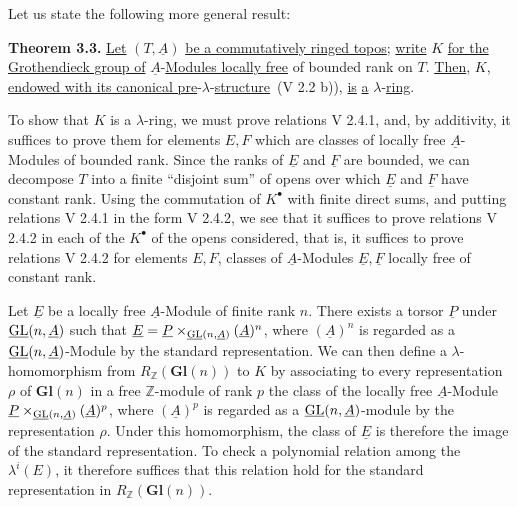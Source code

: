 Let us state the following more general result:

\textbf{Theorem 3.3.} \uline{Let} \((T,\underline{A})\) \uline{be a commutatively ringed topos}; \uline{write} \(K\) \uline{for the Grothendieck group of} \(\underline{A}\)-\uline{Modules locally free} of bounded rank on \(T\). \uline{Then}, \(K\), \uline{endowed with its canonical pre}-\(\lambda\)-\uline{structure}~(V 2.2 b)), \uline{is} \uline{a} \(\lambda\)-\uline{ring}.

To show that \(K\) is a \(\lambda\)-ring, we must prove relations V 2.4.1, and, by additivity, it suffices to prove them for elements \(E,F\) which are classes of locally free \(\underline{A}\)-Modules of bounded rank. Since the ranks of \(\underline{E}\) and \(\underline{F}\) are bounded, we can decompose \(T\) into a finite ``disjoint sum'' of opens over which \(\underline{E}\) and \(\underline{F}\) have constant rank. Using the commutation of \(K^{\bullet}\) with finite direct sums, and putting relations V 2.4.1 in the form V 2.4.2, we see that it suffices to prove relations V 2.4.2 in each of the \(K^{\bullet}\) of the opens considered, that is, it suffices to prove relations V 2.4.2 for elements \(E,F\), classes of \(\underline{A}\)-Modules \(\underline{E},\underline{F}\) locally free of constant rank.

%
Let \(\underline{E}\) be a locally free \(\underline{A}\)-Module of finite rank \(n\). There exists a torsor \(\underline{P}\) under \(\underline{\operatorname{GL}}(n,\underline{A})\) such that \(\underline{E}=\underline{P}\times_{\underline{\operatorname{GL}}(n,\underline{A})} (\underline{A})^n\), where \((\underline{A})^n\) is regarded as a \(\underline{\operatorname{GL}}(n,\underline{A})\)-Module by the standard representation. We can then define a \(\lambda\)-homomorphism from \(R_{\mathbb Z}(\mathbf{Gl}(n))\) to \(K\) by associating to every representation \(\rho\) of \(\mathbf{Gl}(n)\) in a free \(\mathbb Z\)-module of rank \(p\) the class of the locally free \(\underline{A}\)-Module
\(\underline{P}\times_{\underline{\operatorname{GL}}(n,\underline{A})} (\underline{A})^p\), where \((\underline{A})^p\) is regarded as a \(\underline{\operatorname{GL}}(n,\underline{A})\)-module by the representation \(\rho\). Under this homomorphism, the class of \(\underline{E}\) is therefore the image of the standard representation. To check a polynomial relation among the \(\lambda^i(E)\), it therefore suffices that this relation hold for the standard representation in \(R_{\mathbb Z}(\mathbf{Gl}(n))\).

